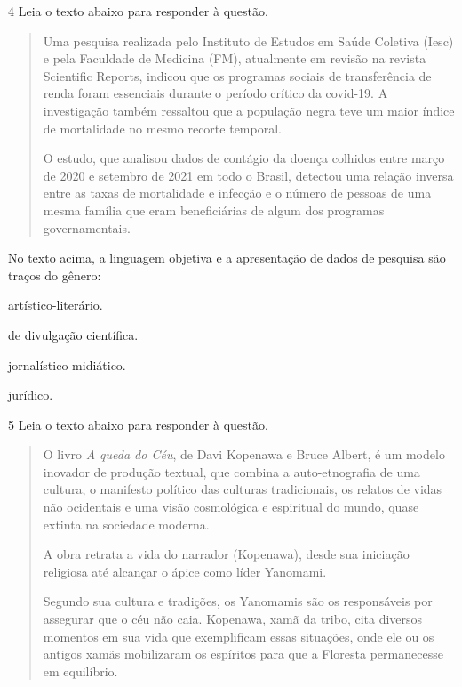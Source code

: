 \num{4} Leia o texto abaixo para responder à questão.

\begin{quote}

Uma pesquisa realizada pelo Instituto de Estudos em Saúde Coletiva
(Iesc) e pela Faculdade de Medicina (FM), atualmente em revisão na
revista Scientific Reports, indicou que os programas sociais de
transferência de renda foram essenciais durante o período crítico da
covid-19. A investigação também ressaltou que a população negra teve um
maior índice de mortalidade no mesmo recorte temporal.

O estudo, que analisou dados de contágio da doença colhidos entre março
de 2020 e setembro de 2021 em todo o Brasil, detectou uma relação
inversa entre as taxas de mortalidade e infecção e o número de pessoas
de uma mesma família que eram beneficiárias de algum dos programas
governamentais.

\end{quote}


No texto acima, a linguagem objetiva e a apresentação de dados de pesquisa são traços do 
gênero:

\begin{escolha}

    \item artístico-literário.

    \item de divulgação científica.

    \item jornalístico midiático.

    \item jurídico.

\end{escolha}

\num{5} Leia o texto abaixo para responder à questão. 

\begin{quote}

O livro \textit{A queda do Céu}, de Davi Kopenawa e Bruce Albert, é um modelo
inovador de produção textual, que combina a auto-etnografia de uma
cultura, o manifesto político das culturas tradicionais, os relatos de
vidas não ocidentais e uma visão cosmológica e espiritual do mundo,
quase extinta na sociedade moderna.

A obra retrata a vida do narrador (Kopenawa), desde sua iniciação
religiosa até alcançar o ápice como líder Yanomami.

Segundo sua cultura e tradições, os Yanomamis são os responsáveis por
assegurar que o céu não caia. Kopenawa, xamã da tribo, cita diversos
momentos em sua vida que exemplificam essas situações, onde ele ou os
antigos xamãs mobilizaram os espíritos para que a Floresta permanecesse
em equilíbrio.

\end{quote}

